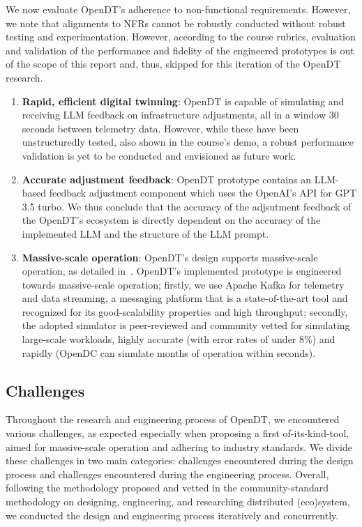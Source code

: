 We now evaluate OpenDT's adherence to non-functional requirements. However, we note that alignments to NFRs cannot be robustly conducted without robust testing and experimentation. However, according to the course rubrics, evaluation and validation of the performance and fidelity of the engineered prototypes is out of the scope of this report and, thus, skipped for this iteration of the OpenDT research.
\begin{enumerate}[label=\textbf{(NFR\arabic*)},leftmargin=0pt,itemindent=3em]
    \item \label{design:nfr1} \textbf{Rapid, efficient digital twinning}: 
    OpenDT is capable of simulating and receiving LLM feedback on infrastructure adjustments, all in a window 30 seconds between telemetry data. However, while these have been unstructuredly tested, also shown in the course's demo, a robust performance validation is yet to be conducted and envisioned as future work.
    
    \item \label{design:nfr2} \textbf{Accurate adjustment feedback}: 
    OpenDT prototype contains an LLM-based feedback adjustment component which uses the OpenAI's API for GPT 3.5 turbo. We thus conclude that the accuracy of the adjsutment feedback of the OpenDT's ecosystem is directly dependent on the accuracy of the implemented LLM and the structure of the LLM prompt.
    
    \item \label{design:nfr3} \textbf{Massive-scale operation}: 
    OpenDT's design supports massive-scale operation, as detailed in~. OpenDT's implemented prototype is engineered towards massive-scale operation; firstly, we use Apache Kafka for telemetry and data streaming, a messaging platform that is a state-of-the-art tool and recognized for its good-scalability properties and high throughput; secondly, the adopted simulator is peer-reviewed and community vetted for simulating large-scale workloads, highly accurate (with error rates of under 8\%) and rapidly (OpenDC can simulate months of operation within seconds).
\end{enumerate}



\subsection{Challenges}\label{sec:reflection:challenges}
Throughout the research and engineering process of OpenDT, we encountered various challenges, as expected especially when proposing a first of-its-kind-tool, aimed for massive-scale operation and adhering to industry standards. We divide these challenges in two main categories: challenges encountered during the design process and challenges encountered during the engineering process. Overall, following the methodology proposed and vetted in the community-standard methodology on designing, engineering, and researching distributed (eco)system, we conducted the design and engineering process iteratively and concurrently.

